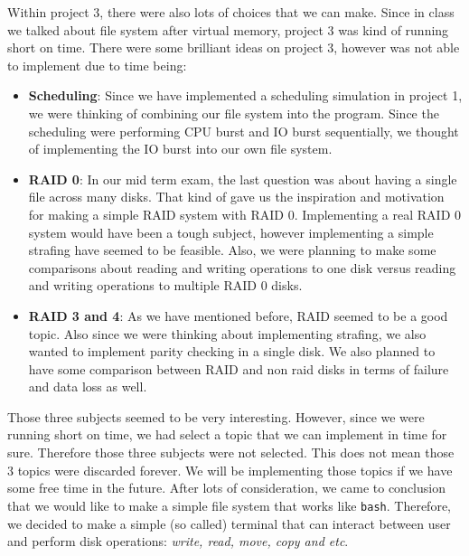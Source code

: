 \documentclass{homework}
\begin{document}
Within project 3, there were also lots of choices that we can make. Since in class we talked about file system after virtual memory, project 3 was kind of running short on time. There were some brilliant ideas on project 3, however was not able to implement due to time being:
\begin{itemize}
    \item \textbf{Scheduling}: Since we have implemented a scheduling simulation in project 1, we were thinking of combining our file system into the program. Since the scheduling were performing CPU burst and IO burst sequentially, we thought of implementing the IO burst into our own file system. 
    \item \textbf{RAID 0}: In our mid term exam, the last question was about having a single file across many disks. That kind of gave us the inspiration and motivation for making a simple RAID system with RAID 0. Implementing a real RAID 0 system would have been a tough subject, however implementing a simple strafing have seemed to be feasible. Also, we were planning to make some comparisons about reading and writing operations to one disk versus reading and writing operations to multiple RAID 0 disks.
    \item \textbf{RAID 3 and 4}: As we have mentioned before, RAID seemed to be a good topic. Also since we were thinking about implementing strafing, we also wanted to implement parity checking in a single disk. We also planned to have some comparison between RAID and non raid disks in terms of failure and data loss as well. 
\end{itemize}
Those three subjects seemed to be very interesting. However, since we were running short on time, we had select a topic that we can implement in time for sure. Therefore those three subjects were not selected. This does not mean those 3 topics were discarded forever. We will be implementing those topics if we have some free time in the future. After lots of consideration, we came to conclusion that we would like to make a simple file system that works like \texttt{bash}. Therefore, we decided to make a simple (so called) terminal that can interact between user and perform disk operations: \textit{write, read, move, copy and etc}. 
\end{document}
